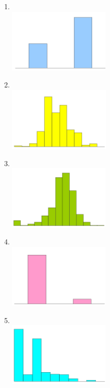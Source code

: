 \documentclass[12pt]{article}
\begin{document}
\begin{enumerate}
\begin{multicols}{3}
\begin{enumerate}

\item[(1)] $\:$ \\
\includegraphics[height=1.2in]{figures/gender}

\item[(2)] $\:$ \\
\includegraphics[height=1.2in]{figures/height}

\item[(3)] $\:$ \\
\includegraphics[height=1.2in]{figures/sleep}

\item[(4)] $\:$ \\
\includegraphics[height=1.2in]{figures/off_campus}

\item[(5)] $\:$ \\
\includegraphics[height=1.2in]{figures/piercings}


\end{enumerate}
\end{multicols}
\end{enumerate}
\end{document}
